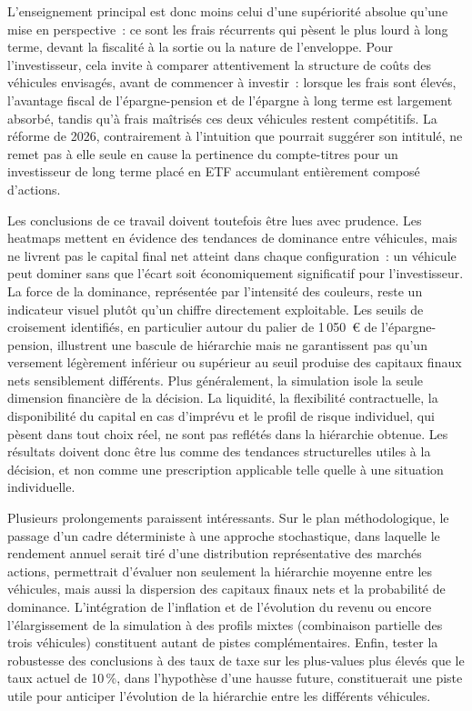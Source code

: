 ﻿\documentclass[12pt, a4paper]{article}
\begin{document}
L'enseignement principal est donc moins celui d'une supériorité absolue
qu'une mise en perspective~: ce sont les frais récurrents qui pèsent le
plus lourd à long terme, devant la fiscalité à la sortie ou la nature de
l'enveloppe. Pour l'investisseur, cela invite à comparer attentivement la
structure de coûts des véhicules envisagés, avant
de commencer à investir~: lorsque les frais sont élevés, l'avantage
fiscal de l'épargne-pension et de l'épargne à long terme est largement
absorbé, tandis qu'à frais maîtrisés ces deux véhicules restent
compétitifs. La réforme de 2026, contrairement à l'intuition que pourrait
suggérer son intitulé, ne remet pas à elle seule en cause la pertinence
du compte-titres pour un investisseur de long terme placé en ETF accumulant
entièrement composé d'actions.

Les conclusions de ce travail doivent toutefois être lues avec prudence.
Les heatmaps mettent en évidence des tendances de dominance entre
véhicules, mais ne livrent pas le capital final net atteint dans chaque
configuration~: un véhicule peut dominer sans que l'écart soit
économiquement significatif pour l'investisseur. La force de la dominance,
représentée par l'intensité des couleurs, reste un indicateur visuel
plutôt qu'un chiffre directement exploitable. Les seuils de croisement
identifiés, en particulier autour du palier de 1\,050~€ de
l'épargne-pension, illustrent une bascule de hiérarchie mais ne
garantissent pas qu'un versement légèrement inférieur ou supérieur au
seuil produise des capitaux finaux nets sensiblement différents. Plus
généralement, la simulation isole la seule dimension financière de la
décision. La liquidité, la flexibilité contractuelle, la disponibilité
du capital en cas d'imprévu et le profil de risque individuel, qui
pèsent dans tout choix réel, ne sont pas reflétés dans la hiérarchie
obtenue. Les résultats doivent donc être lus comme des tendances
structurelles utiles à la décision, et non comme une prescription
applicable telle quelle à une situation individuelle.

Plusieurs prolongements paraissent intéressants. Sur le plan
méthodologique, le passage d'un cadre déterministe à une approche
stochastique, dans laquelle le rendement annuel serait tiré d'une
distribution représentative des marchés actions, permettrait d'évaluer
non seulement la hiérarchie moyenne entre les véhicules, mais aussi la
dispersion des capitaux finaux nets et la probabilité de dominance.
L'intégration de l'inflation et de l'évolution du revenu
ou encore l'élargissement de la simulation à des profils mixtes
(combinaison partielle des trois véhicules) constituent autant de
pistes complémentaires. Enfin, tester la robustesse des conclusions à des taux de taxe sur les
plus-values plus élevés que le taux actuel de 10\,\%, dans l'hypothèse
d'une hausse future, constituerait une piste utile pour anticiper
l'évolution de la hiérarchie entre les différents véhicules.
\end{document}
